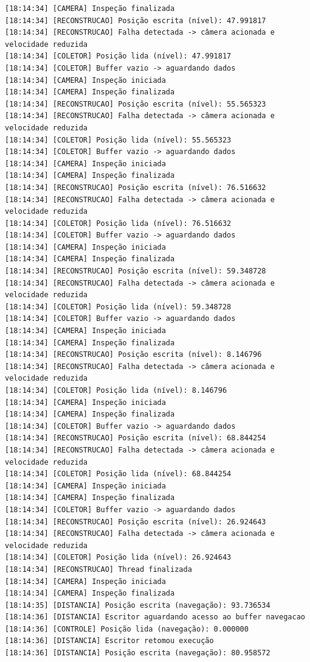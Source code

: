 \documentclass[12pt]{article}
\begin{document}
\begin{verbatim}
[18:14:34] [CAMERA] Inspeção finalizada
[18:14:34] [RECONSTRUCAO] Posição escrita (nível): 47.991817
[18:14:34] [RECONSTRUCAO] Falha detectada -> câmera acionada e velocidade reduzida
[18:14:34] [COLETOR] Posição lida (nível): 47.991817
[18:14:34] [COLETOR] Buffer vazio -> aguardando dados
[18:14:34] [CAMERA] Inspeção iniciada
[18:14:34] [CAMERA] Inspeção finalizada
[18:14:34] [RECONSTRUCAO] Posição escrita (nível): 55.565323
[18:14:34] [RECONSTRUCAO] Falha detectada -> câmera acionada e velocidade reduzida
[18:14:34] [COLETOR] Posição lida (nível): 55.565323
[18:14:34] [COLETOR] Buffer vazio -> aguardando dados
[18:14:34] [CAMERA] Inspeção iniciada
[18:14:34] [CAMERA] Inspeção finalizada
[18:14:34] [RECONSTRUCAO] Posição escrita (nível): 76.516632
[18:14:34] [RECONSTRUCAO] Falha detectada -> câmera acionada e velocidade reduzida
[18:14:34] [COLETOR] Posição lida (nível): 76.516632
[18:14:34] [COLETOR] Buffer vazio -> aguardando dados
[18:14:34] [CAMERA] Inspeção iniciada
[18:14:34] [CAMERA] Inspeção finalizada
[18:14:34] [RECONSTRUCAO] Posição escrita (nível): 59.348728
[18:14:34] [RECONSTRUCAO] Falha detectada -> câmera acionada e velocidade reduzida
[18:14:34] [COLETOR] Posição lida (nível): 59.348728
[18:14:34] [COLETOR] Buffer vazio -> aguardando dados
[18:14:34] [CAMERA] Inspeção iniciada
[18:14:34] [CAMERA] Inspeção finalizada
[18:14:34] [RECONSTRUCAO] Posição escrita (nível): 8.146796
[18:14:34] [RECONSTRUCAO] Falha detectada -> câmera acionada e velocidade reduzida
[18:14:34] [COLETOR] Posição lida (nível): 8.146796
[18:14:34] [CAMERA] Inspeção iniciada
[18:14:34] [CAMERA] Inspeção finalizada
[18:14:34] [COLETOR] Buffer vazio -> aguardando dados
[18:14:34] [RECONSTRUCAO] Posição escrita (nível): 68.844254
[18:14:34] [RECONSTRUCAO] Falha detectada -> câmera acionada e velocidade reduzida
[18:14:34] [COLETOR] Posição lida (nível): 68.844254
[18:14:34] [CAMERA] Inspeção iniciada
[18:14:34] [CAMERA] Inspeção finalizada
[18:14:34] [COLETOR] Buffer vazio -> aguardando dados
[18:14:34] [RECONSTRUCAO] Posição escrita (nível): 26.924643
[18:14:34] [RECONSTRUCAO] Falha detectada -> câmera acionada e velocidade reduzida
[18:14:34] [COLETOR] Posição lida (nível): 26.924643
[18:14:34] [RECONSTRUCAO] Thread finalizada
[18:14:34] [CAMERA] Inspeção iniciada
[18:14:34] [CAMERA] Inspeção finalizada
[18:14:35] [DISTANCIA] Posição escrita (navegação): 93.736534
[18:14:36] [DISTANCIA] Escritor aguardando acesso ao buffer navegacao
[18:14:36] [CONTROLE] Posição lida (navegação): 0.000000
[18:14:36] [DISTANCIA] Escritor retomou execução
[18:14:36] [DISTANCIA] Posição escrita (navegação): 80.958572

\end{verbatim}
\end{document}
